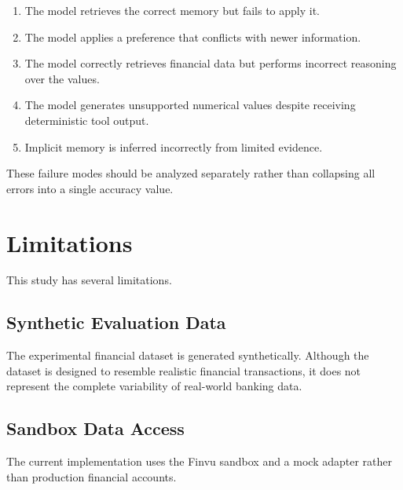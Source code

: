 \documentclass[conference]{IEEEtran}
\begin{document}
    \begin{enumerate}
    
        \item The model retrieves the correct memory but fails to apply it.
    
        \item The model applies a preference that conflicts with newer
        information.
    
        \item The model correctly retrieves financial data but performs
        incorrect reasoning over the values.
    
        \item The model generates unsupported numerical values despite
        receiving deterministic tool output.
    
        \item Implicit memory is inferred incorrectly from limited evidence.
    
    \end{enumerate}
    
    These failure modes should be analyzed separately rather than collapsing
    all errors into a single accuracy value.
    
    
    \section{Limitations}
    
    This study has several limitations.
    
    \subsection{Synthetic Evaluation Data}
    
    The experimental financial dataset is generated synthetically.
    Although the dataset is designed to resemble realistic financial
    transactions, it does not represent the complete variability of
    real-world banking data.
    
    \subsection{Sandbox Data Access}
    
    The current implementation uses the Finvu sandbox and a mock adapter
    rather than production financial accounts.
    
\end{document}
